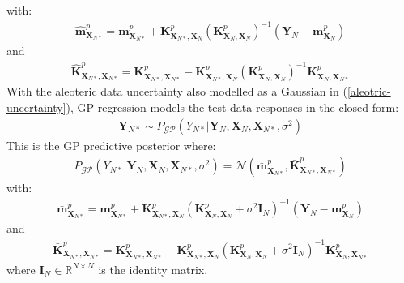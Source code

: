 \documentclass{article}
\newcommand{\GP}{\operatorname{\mathcal{GP}}}
\numberwithin{equation}{section}
\begin{document}
with:
\begin{align}
    \label{gp-epistemic-posterior-mean}
    \hat{\mathbf{m}}^p_{\mathbf{X}_{N*}} = \mathbf{m}^p_{\mathbf{X}_{N*}} + \mathbf{K}^p_{\mathbf{X}_{N*}, \mathbf{X}_N} \left(\mathbf{K}^p_{\mathbf{X}_N, \mathbf{X}_N}\right)^{-1} \left( \mathbf{Y}_N - \mathbf{m}^p_{\mathbf{X}_N}\right)
\end{align}
and
\begin{align}
    \label{gp-epistemic-posterior-covariance}
    \hat{\mathbf{K}}^p_{\mathbf{X}_{N*}, \mathbf{X}_{N*}} = \mathbf{K}^p_{\mathbf{X}_{N*}, \mathbf{X}_{N*}} - \mathbf{K}^p_{\mathbf{X}_{N*}, \mathbf{X}_N}\left(\mathbf{K}^p_{\mathbf{X}_N, \mathbf{X}_N}\right)^{-1}\mathbf{K}^p_{\mathbf{X}_N, \mathbf{X}_{N*}}
\end{align}
With the aleoteric data uncertainty also modelled as a Gaussian in (\ref{aleotric-uncertainty}), GP regression models the test data responses in the closed form:
\begin{align}
    \mathbf{Y}_{N*} \sim P_{\GP}\left(Y_{N*} \vert \mathbf{Y}_N, \mathbf{X}_N, \mathbf{X}_{N*}, \sigma^2\right)
    \label{gp-posterior}
\end{align}
This is the GP predictive posterior where:
\begin{align}
    P_{\GP}\left(Y_{N*} \vert \mathbf{Y}_N, \mathbf{X}_N, \mathbf{X}_{N*}, \sigma^2\right) = \mathcal{N}\left(\bar{\mathbf{m}}^p_{\mathbf{X}_{N*}}, \bar{\mathbf{K}}^p_{\mathbf{X}_{N*}, \mathbf{X}_{N*}}\right)
    \label{gp-posterior-normal}
\end{align}
with:
\begin{align}
    \label{gp-posterior-mean}
    \bar{\mathbf{m}}^p_{\mathbf{X}_{N*}} = \mathbf{m}^p_{\mathbf{X}_{N*}} + \mathbf{K}^p_{\mathbf{X}_{N*}, \mathbf{X}_N} \left( \mathbf{K}^p_{\mathbf{X}_N, \mathbf{X}_N} + \sigma^2 \mathbf{I}_N\right)^{-1} \left( \mathbf{Y}_N - \mathbf{m}^p_{\mathbf{X}_N}\right)
\end{align}
and
\begin{align}
    \label{gp-posterior-covariance}
    \bar{\mathbf{K}}^p_{\mathbf{X}_{N*}, \mathbf{X}_{N*}} = \mathbf{K}^p_{\mathbf{X}_{N*}, \mathbf{X}_{N*}} - \mathbf{K}^p_{\mathbf{X}_{N*}, \mathbf{X}_N}\left( \mathbf{K}^p_{\mathbf{X}_N, \mathbf{X}_N} + \sigma^2 \mathbf{I}_N\right)^{-1}\mathbf{K}^p_{\mathbf{X}_N, \mathbf{X}_{N*}}
\end{align}
where $\mathbf{I}_N \in \mathbb{R}^{N \times N}$ is the identity matrix.
\end{document}
